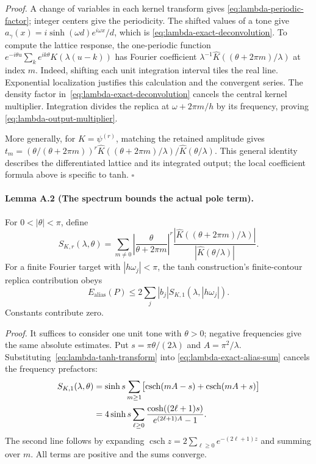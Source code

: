 \emph{Proof.}
A change of variables in each kernel transform gives
\eqref{eq:lambda-periodic-factor}; integer centers give the periodicity.
The shifted values of a tone give
$a_\gamma(x)=i\sinh(\omega d)e^{i\omega x}/d$, which is
\eqref{eq:lambda-exact-deconvolution}. To compute the lattice response,
the one-periodic function
$e^{-i\theta u}\sum_ke^{ik\theta}K(\lambda(u-k))$ has Fourier
coefficient $\lambda^{-1}\widehat K((\theta+2\pi m)/\lambda)$ at index $m$.
Indeed, shifting each unit integration interval tiles the real line.
Exponential localization justifies this calculation and the convergent
series. The density factor in~\eqref{eq:lambda-exact-deconvolution}
cancels the central kernel multiplier. Integration divides the replica
at $\omega+2\pi m/h$ by its frequency, proving
\eqref{eq:lambda-output-multiplier}.

More generally, for $K=\psi^{(r)}$, matching the retained amplitude gives
$t_m=(\theta/(\theta+2\pi m))^r
\widehat K((\theta+2\pi m)/\lambda)/\widehat K(\theta/\lambda)$.
This general identity describes the differentiated lattice and its
integrated output; the local coefficient formula above is specific to tanh.
\hfill$\square$

\paragraph{Lemma A.2 (The spectrum bounds the actual pole term).}
For $0<|\theta|<\pi$, define
\begin{equation}
 S_{K,r}(\lambda,\theta)=
 \sum_{m\ne0}\left|\frac{\theta}{\theta+2\pi m}\right|^r
 \frac{|\widehat K((\theta+2\pi m)/\lambda)|}
 {|\widehat K(\theta/\lambda)|}.
 \label{eq:lambda-exact-alias-sum}
\end{equation}
For a finite Fourier target with $|h\omega_j|<\pi$, the tanh construction's
finite-contour replica contribution obeys
\begin{equation}
 E_{\mathrm{alias}}(P)\le
 2\sum_j|b_j|S_{K,1}(\lambda,|h\omega_j|).
 \label{eq:lambda-pole-spectrum-bound}
\end{equation}
Constants contribute zero.

\emph{Proof.}
It suffices to consider one unit tone with $\theta>0$; negative
frequencies give the same absolute estimates. Put
$s=\pi\theta/(2\lambda)$ and $A=\pi^2/\lambda$.
Substituting~\eqref{eq:lambda-tanh-transform} into
\eqref{eq:lambda-exact-alias-sum} cancels the frequency prefactors:
\begin{align}
 S_{K,1}(\lambda,\theta)
 &=\sinh s\sum_{m\ge1}
   \bigl[\operatorname{csch}(mA-s)+\operatorname{csch}(mA+s)\bigr]
 \notag\\
 &=4\sinh s\sum_{\ell\ge0}
   \frac{\cosh((2\ell+1)s)}{e^{(2\ell+1)A}-1}.
 \label{eq:lambda-residue-spectrum-identity}
\end{align}
The second line follows by expanding
$\operatorname{csch}z=2\sum_{\ell\ge0}e^{-(2\ell+1)z}$ and summing
over $m$. All terms are positive and the sums converge.

